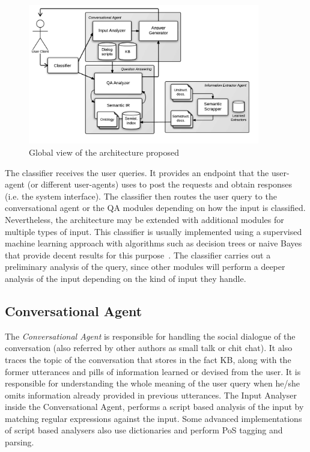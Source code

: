 \begin{figure}[!htbp]
    \centering
    \includegraphics[width=0.9\textwidth]{img/arch/global_1-3.png}
    \caption{Global view of the architecture proposed}
    \label{fig:arch1}
\end{figure}

The classifier receives the user queries. It provides an endpoint that the user-agent (or different user-agents) uses to post the requests and obtain responses (i.e. the system interface). The classifier then routes the user query to the conversational agent or the \ac{QA} modules depending on how the input is classified. Nevertheless, the architecture may be extended with additional modules for multiple types of input. This classifier is usually implemented using a supervised machine learning approach with algorithms such as decision trees or naive Bayes that provide decent results for this purpose~\cite{Samei2014,Moldovan2011}. The classifier carries out a preliminary analysis of the query, since other modules will perform a deeper analysis of the input depending on the kind of input they handle.

\subsection{Conversational Agent}

The \emph{Conversational Agent} is responsible for handling the social dialogue of the conversation (also referred by other authors as small talk or chit chat). It also traces the topic of the conversation that stores in the fact \ac{KB}, along with the former utterances and pills of information learned or devised from the user. It is responsible for understanding the whole meaning of the user query when he/she omits information already provided in previous utterances. 
The Input Analyser inside the Conversational Agent, performs a script based analysis of the input by matching regular expressions against the input. Some advanced implementations of script based analysers also use dictionaries and perform \ac{PoS} tagging and parsing.

